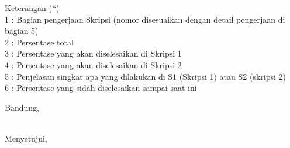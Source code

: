 \documentclass[a4paper,twoside]{article}
\begin{document}
Keterangan (*)\\
1 : Bagian pengerjaan Skripsi (nomor disesuaikan dengan detail pengerjaan di bagian 5)\\
2 : Persentase total \\
3 : Persentase yang akan diselesaikan di Skripsi 1 \\
4 : Persentase yang akan diselesaikan di Skripsi 2 \\
5 : Penjelasan singkat apa yang dilakukan di S1 (Skripsi 1) atau S2 (skripsi 2)\\
6 : Persentase yang sidah diselesaikan sampai saat ini 


\newpage
\vspace{1cm}
\centering Bandung, \tanggal\\
\vspace{2cm} \nama \\ 
\vspace{1cm}

Menyetujui, \\
\end{document}
